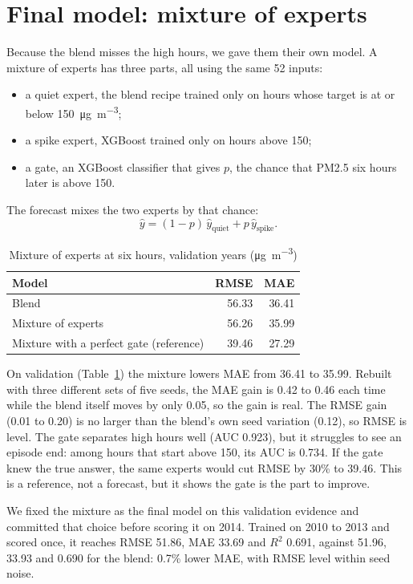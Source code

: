 \documentclass[conference]{IEEEtran}
\newcommand{\ugm}{\si{\micro\gram\per\cubic\metre}}
\begin{document}
\section{Final model: mixture of experts}
\label{sec:moe}
Because the blend misses the high hours, we gave them their own model. A mixture of experts \cite{jacobs1991} has three parts, all using the same 52 inputs:
\begin{itemize}
\item a quiet expert, the blend recipe trained only on hours whose target is at or below 150~\ugm;
\item a spike expert, XGBoost trained only on hours above 150;
\item a gate, an XGBoost classifier that gives $p$, the chance that PM2.5 six hours later is above 150.
\end{itemize}
The forecast mixes the two experts by that chance:
\begin{equation}
\hat{y} = (1-p)\,\hat{y}_{\text{quiet}} + p\,\hat{y}_{\text{spike}} .
\end{equation}

\begin{table}[!htb]
\centering
\caption{Mixture of experts at six hours, validation years (\ugm)}
\label{tab:moe}
\begin{tabular}{@{}lrr@{}}
\toprule
Model & RMSE & MAE \\
\midrule
Blend & 56.33 & 36.41 \\
Mixture of experts & 56.26 & 35.99 \\
Mixture with a perfect gate (reference) & 39.46 & 27.29 \\
\bottomrule
\end{tabular}
\end{table}

On validation (Table~\ref{tab:moe}) the mixture lowers MAE from 36.41 to 35.99. Rebuilt with three different sets of five seeds, the MAE gain is 0.42 to 0.46 each time while the blend itself moves by only 0.05, so the gain is real. The RMSE gain (0.01 to 0.20) is no larger than the blend's own seed variation (0.12), so RMSE is level. The gate separates high hours well (AUC 0.923), but it struggles to see an episode end: among hours that start above 150, its AUC is 0.734. If the gate knew the true answer, the same experts would cut RMSE by 30\% to 39.46. This is a reference, not a forecast, but it shows the gate is the part to improve.

We fixed the mixture as the final model on this validation evidence and committed that choice before scoring it on 2014. Trained on 2010 to 2013 and scored once, it reaches RMSE 51.86, MAE 33.69 and $R^2$ 0.691, against 51.96, 33.93 and 0.690 for the blend: 0.7\% lower MAE, with RMSE level within seed noise.
\end{document}
